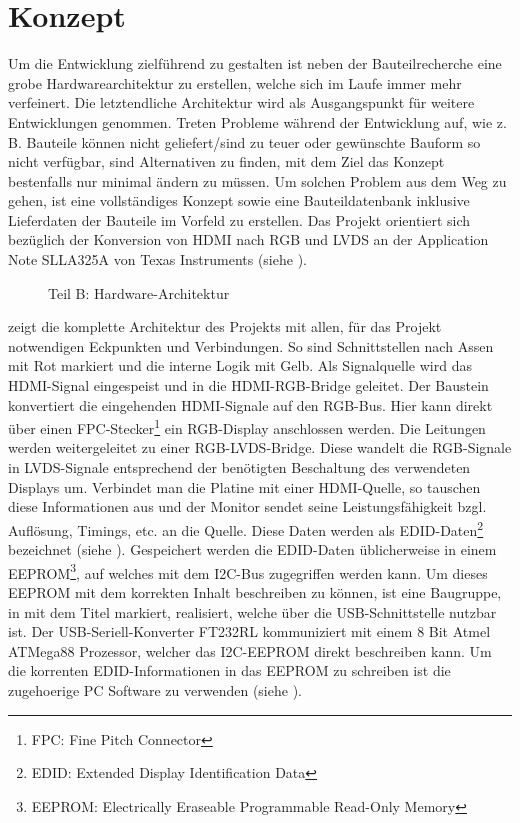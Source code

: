 \section{Konzept}
\label{sec:TeilB_Konzept}
Um die Entwicklung zielführend zu gestalten ist neben der Bauteilrecherche eine grobe Hardwarearchitektur zu erstellen, welche sich im Laufe immer mehr verfeinert. Die letztendliche Architektur wird als Ausgangspunkt für weitere Entwicklungen genommen. Treten Probleme während der Entwicklung auf, wie z. B. Bauteile können nicht geliefert/sind zu teuer oder gewünschte Bauform so nicht verfügbar, sind Alternativen zu finden, mit dem Ziel das Konzept bestenfalls nur minimal ändern zu müssen. Um solchen Problem aus dem Weg zu gehen, ist eine vollständiges Konzept sowie eine Bauteildatenbank inklusive Lieferdaten der Bauteile im Vorfeld zu erstellen. Das Projekt orientiert sich bezüglich der Konversion von HDMI nach RGB und LVDS an der Application Note SLLA325A von Texas Instruments (siehe \cite{TI2011}).
\begin{figure}[htp]
	\centering
{}
	\caption{Teil B: Hardware-Architektur}
	\label{fig:teilb_architektur}
\end{figure}

 zeigt die komplette Architektur des Projekts mit allen, für das Projekt notwendigen Eckpunkten und Verbindungen. So sind Schnittstellen nach Assen mit Rot markiert und die interne Logik mit Gelb. Als Signalquelle wird das HDMI-Signal eingespeist und in die HDMI-RGB-Bridge geleitet. Der Baustein  konvertiert die eingehenden HDMI-Signale auf den RGB-Bus. Hier kann direkt über einen FPC-Stecker\footnote{FPC: Fine Pitch Connector} ein RGB-Display anschlossen werden. Die Leitungen werden weitergeleitet zu einer RGB-LVDS-Bridge. Diese wandelt die RGB-Signale in LVDS-Signale entsprechend der benötigten Beschaltung des verwendeten Displays um. Verbindet man die Platine mit einer HDMI-Quelle, so tauschen diese Informationen aus und der Monitor sendet seine Leistungsfähigkeit bzgl. Auflösung, Timings, etc. an die Quelle. Diese Daten werden als EDID-Daten\footnote{EDID: Extended Display Identification Data} bezeichnet (siehe ). Gespeichert werden die EDID-Daten üblicherweise in einem EEPROM\footnote{EEPROM: Electrically Eraseable Programmable Read-Only Memory}, auf welches mit dem I2C-Bus zugegriffen werden kann. Um dieses EEPROM mit dem korrekten Inhalt beschreiben zu können, ist eine Baugruppe, in  mit dem Titel  markiert, realisiert, welche über die USB-Schnittstelle nutzbar ist. Der USB-Seriell-Konverter FT232RL kommuniziert mit einem 8 Bit Atmel ATMega88 Prozessor, welcher das I2C-EEPROM direkt beschreiben kann. Um die korrenten EDID-Informationen in das EEPROM zu schreiben ist die zugehoerige PC Software zu verwenden (siehe ).\newpage